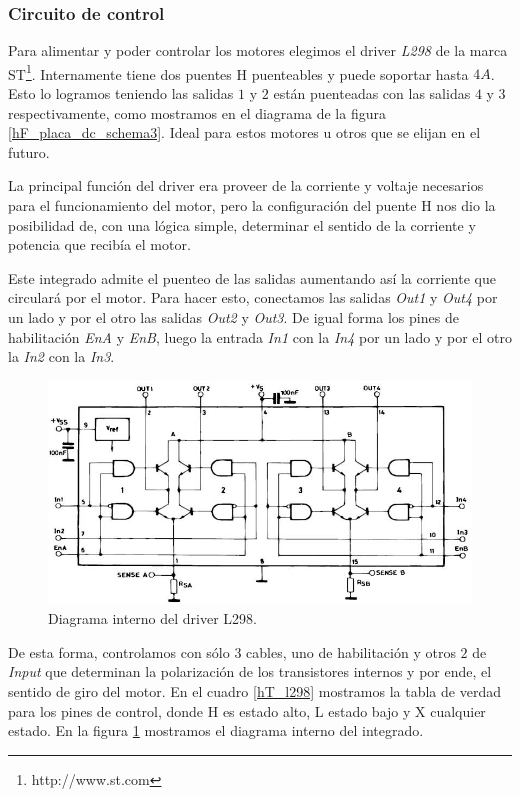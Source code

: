 \subsubsection{Circuito de control}
\label{h_actuadores_motorDC_circuito}

Para alimentar y poder controlar los motores elegimos el driver \emph{L298} de la marca ST\footnote{http://www.st.com}.
Internamente tiene dos puentes H puenteables y puede soportar hasta $4 A$.
Esto lo logramos teniendo las salidas $1$ y $2$ est\'an puenteadas con las salidas $4$ y $3$ respectivamente, como
mostramos en el diagrama de la figura \ref{hF_placa_dc_schema3}.
Ideal para estos motores u otros que se elijan en el futuro.

La principal funci\'on del driver era proveer de la corriente y voltaje necesarios para el funcionamiento del motor, pero la configuraci\'on
del puente H nos dio la posibilidad de, con una l\'ogica simple, determinar el sentido de la corriente y potencia que recib\'ia el motor.

Este integrado admite el puenteo de las salidas aumentando as\'i la corriente que circular\'a por el motor.
Para hacer esto, conectamos las salidas \emph{Out1} y \emph{Out4} por un lado y por el otro las salidas \emph{Out2} y \emph{Out3}.
De igual forma los pines de habilitaci\'on \emph{EnA} y \emph{EnB}, luego la entrada \emph{In1} con la \emph{In4} por un lado y
por el otro la \emph{In2} con la \emph{In3}.

\begin{figure}[ht]
	\centering
	\includegraphics[scale=0.40]{figuras/L298.png}
	\caption{Diagrama interno del driver L298.}
	\label{hF_l298}
\end{figure}

De esta forma, controlamos con s\'olo $3$ cables, uno de habilitaci\'on y otros $2$ de \emph{Input} que determinan
la polarizaci\'on de los transistores internos y por ende, el sentido de giro del motor.
En el cuadro \ref{hT_l298} mostramos la tabla de verdad para los pines de control, donde H es estado alto, L estado bajo y X cualquier estado.
En la figura \ref{hF_l298} mostramos el diagrama interno del integrado.

